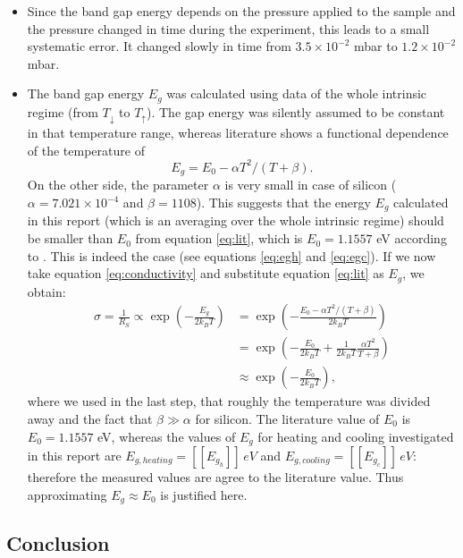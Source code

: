 \documentclass[a4paper]{article}
\begin{document}
\begin{itemize}
\item Since the band gap energy depends on the pressure applied to the sample \cite{benkabou1994} and the pressure changed in time during the experiment, this leads to a small systematic error. It changed slowly in time from $3.5 \times 10^{-2}$ mbar to $1.2\times 10^{-2}$ mbar.
\item The band gap energy $E_g$ was calculated using data of the whole intrinsic regime (from $T_{\downarrow}$ to $T_{\uparrow}$). The gap energy was silently assumed to be constant in that temperature range, whereas literature shows a functional dependence of the temperature of \cite{varshni1967}
\begin{equation}
E_g = E_0 - \alpha T^2/(T + \beta) \label{eq:lit}.
\end{equation}
On the other side, the parameter $\alpha$ is very small in case of silicon ($\alpha = 7.021 \times 10^{-4}$ and $\beta = 1108$). This suggests that the energy $E_g$ calculated in this report (which is an averaging over the whole intrinsic regime) should be smaller than $E_0$ from equation \eqref{eq:lit}, which is $E_0 = 1.1557$ eV according to \cite{varshni1967}. This is indeed the case (see equations \eqref{eq:egh} and \eqref{eq:egc}). If we now take equation \eqref{eq:conductivity} and substitute equation \eqref{eq:lit} as $E_g$, we obtain:
\begin{subequations}
\begin{align}
\sigma = \frac{1}{R_S} \propto \exp{\left( - \frac{E_{g}}{2 k_B T} \right)} &= \exp{\left( - \frac{ E_0 - \alpha T^2/(T + \beta) }{2 k_B T} \right)} \\
&= \exp{\left( - \frac{E_0}{2 k_B T} + \frac{1}{2 k_B T}\frac{\alpha T^2}{T + \beta} \right)} \\
&\approx \exp{\left( - \frac{E_0}{2 k_B T} \right)}
\label{eq:justification},
\end{align}
\end{subequations}
where we used in the last step, that roughly the temperature was divided away and the fact that $\beta \gg \alpha$ for silicon. The literature value of $E_0$ is $E_0 = 1.1557$ eV, whereas the values of $E_g$ for heating and cooling investigated in this report are $E_{g,heating} = [[E_g_h]] \, eV$ and $E_{g,cooling} = [[E_g_c]] \, eV$: therefore the measured values are agree to the literature value. Thus approximating $E_g \approx E_0$ is justified here.
\end{itemize}

\subsection{Conclusion}
\end{document}
